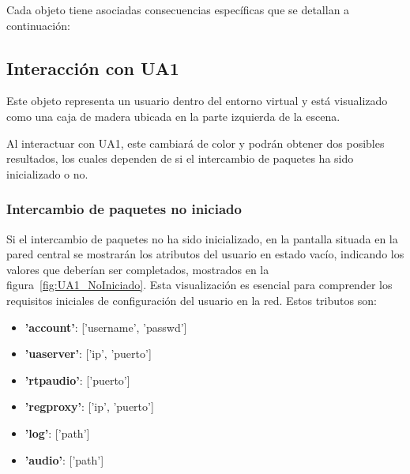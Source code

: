 \documentclass[a4paper, 12pt]{book}
\begin{document}
Cada objeto tiene asociadas consecuencias específicas que se detallan a continuación:

\subsection{Interacción con UA1}
\label{subsec:objeto_ua1}

Este objeto representa un usuario dentro del entorno virtual y está visualizado como una caja 
de madera ubicada en la parte izquierda de la escena.

Al interactuar con UA1, este cambiará de color y podrán obtener dos posibles resultados, los cuales dependen 
de si el intercambio de paquetes ha sido inicializado o no.

\subsubsection{Intercambio de paquetes no iniciado}
\label{subsubsec:Intercambio_NoIniciado}
Si el intercambio de paquetes no ha sido inicializado, en la pantalla situada en la pared central se mostrarán 
los atributos del usuario en estado vacío, indicando los valores que deberían ser completados, mostrados en la figura~\ref{fig:UA1_NoIniciado}. 
Esta visualización es esencial para comprender los requisitos iniciales de configuración del usuario en la red. Estos tributos son:

\begin{itemize}
  \item \textbf{'account'}: ['username', 'passwd']
  \item \textbf{'uaserver'}: ['ip', 'puerto']
  \item \textbf{'rtpaudio'}: ['puerto']
  \item \textbf{'regproxy'}: ['ip', 'puerto']
  \item \textbf{'log'}: ['path']
  \item \textbf{'audio'}: ['path']
\end{itemize}
\end{document}
